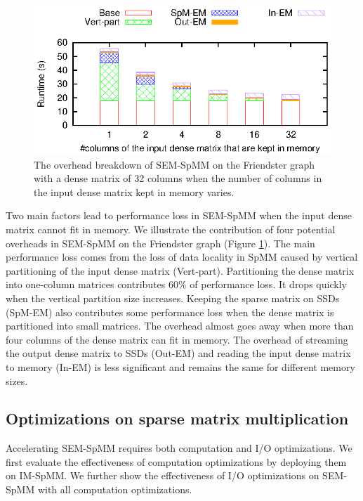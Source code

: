 \begin{figure}
	\begin{center}
		\footnotesize
		\includegraphics[scale=1]{SpMM_figs/spmm-32cols-overhead.eps}
		\caption{The overhead breakdown of SEM-SpMM on the Friendster
			graph with a dense matrix of 32 columns when the number
		of columns in the input dense matrix kept in memory varies. }
		\label{perf:spmm32_over}
	\end{center}
\end{figure}

Two main factors lead to performance loss in SEM-SpMM when the input dense matrix
cannot fit in memory. We illustrate the contribution of four potential overheads
in SEM-SpMM on the Friendster graph (Figure \ref{perf:spmm32_over}). The main
performance loss comes from the loss of data locality in SpMM caused by
vertical partitioning of the input dense matrix (Vert-part). Partitioning
the dense matrix into one-column matrices contributes 60\% of performance loss.
It drops quickly when the vertical
partition size increases. Keeping the sparse matrix on SSDs (SpM-EM)
also contributes some performance loss when the dense matrix is partitioned
into small matrices. The overhead almost goes away when more than four columns
of the dense matrix can fit in memory. The overhead of streaming the output dense
matrix to SSDs (Out-EM) and reading the input dense matrix to memory (In-EM)
is less significant and remains the same for different memory sizes.

\subsection{Optimizations on sparse matrix multiplication} \label{sec:opts}
Accelerating SEM-SpMM requires both computation and I/O optimizations.
We first evaluate the effectiveness of computation optimizations by deploying
them on IM-SpMM. We further show the effectiveness of I/O optimizations on
SEM-SpMM with all computation optimizations.

